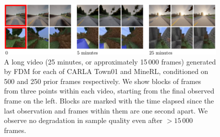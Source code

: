 \begin{figure}[t]
    \centering
    \includegraphics[width=\textwidth]{figs/fdm/fig1.pdf}
    \caption{A long video (25 minutes, or approximately 15\,000 frames) generated by FDM for each of CARLA Town01 and MineRL, conditioned on 500 and 250 prior frames respectively. We show blocks of frames from three points within each video, starting from the final observed frame on the left. Blocks are marked with the time elapsed since the last observation and frames within them are one second apart. We observe no degradation in sample quality even after $>15\,000$ frames.}
    \label{fig:1}
\end{figure}



